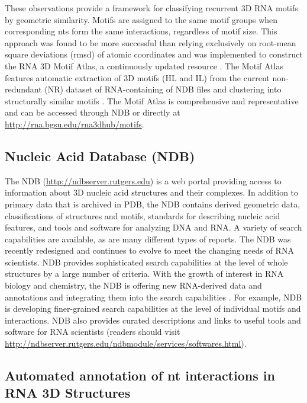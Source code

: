 These observations provide a framework for classifying recurrent 3D RNA motifs
by geometric similarity. Motifs are assigned to the same motif groups when
corresponding nts form the same interactions, regardless of motif size. This
approach was found to be more successful than relying exclusively on root-mean
square deviations (rmsd) of atomic coordinates and was implemented to construct
the RNA 3D Motif Atlas, a continuously updated resource \cite{Petrov2013}. The
Motif Atlas features automatic extraction of 3D motifs (HL and IL) from the
current non-redundant (NR) dataset of RNA-containing of NDB files and clustering
into structurally similar motifs \cite{Petrov2013}. The Motif Atlas is
comprehensive and representative and can be accessed through NDB or directly at
\url{http://rna.bgsu.edu/rna3dhub/motifs}.

\subsection{Nucleic Acid Database (NDB)}

The NDB (\url{http://ndbserver.rutgers.edu}) is a web portal providing access to
information about 3D nucleic acid structures and their complexes. In addition to
primary data that is archived in PDB, the NDB contains derived geometric data,
classifications of structures and motifs, standards for describing nucleic acid
features, and tools and software for analyzing DNA and RNA. A variety of search
capabilities are available, as are many different types of reports. The NDB was
recently redesigned and continues to evolve to meet the changing needs of RNA
scientists. NDB provides sophisticated search capabilities at the level of whole
structures by a large number of criteria. With the growth of interest in RNA
biology and chemistry, the NDB is offering new RNA-derived data and annotations
and integrating them into the search capabilities
\cite{CoimbatoreNarayanan2014}. For example, NDB is developing finer-grained
search capabilities at the level of individual motifs and interactions. NDB also
provides curated descriptions and links to useful tools and software for RNA
scientists (readers should visit
\url{http://ndbserver.rutgers.edu/ndbmodule/services/softwares.html}).

\subsection{Automated annotation of nt interactions in RNA 3D Structures}

